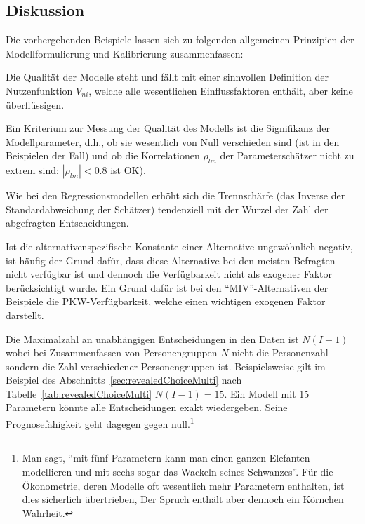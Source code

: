 \subsection{\label{sec:calibrDiskussion}Diskussion}
%
Die vorhergehenden Beispiele lassen sich zu folgenden allgemeinen
Prinzipien der Modellformulierung und Kalibrierung zusammenfassen:

\bi
\item Die Qualit\"at der Modelle steht und f\"allt mit einer
sinnvollen Definition der Nutzenfunktion $V_{ni}$, welche alle
wesentlichen Einflussfaktoren enth\"alt, aber keine
\"uber\-fl\"ussi\-gen.

\item Ein Kriterium zur Messung der Qualit\"at des Modells
 ist die Signifikanz der
Modellparameter, d.h., ob sie wesentlich von Null verschieden
sind (ist in den Beispielen der Fall) und ob die Korrelationen $\rho_{lm}$ der
Parametersch\"atzer nicht zu extrem  sind: $|\rho_{lm}|<0.8$ ist OK).

\item Wie bei den Regressionsmodellen erh\"oht sich die Trennsch\"arfe
  (das Inverse der Standardabweichung der Sch\"atzer)
  tendenziell mit der Wurzel der Zahl der abgefragten Entscheidungen.

\item Ist die alternativenspezifische Konstante einer Alternative
  ungew\"ohnlich negativ, ist h\"aufig der Grund daf\"ur, dass diese
  Alternative bei den meisten Befragten  nicht verf\"ugbar ist und dennoch die
  Verf\"ugbarkeit nicht als exogener Faktor ber\"ucksichtigt wurde.  Ein Grund
daf\"ur ist bei den ``MIV''-Alternativen der Beispiele die
 PKW-Verf\"ugbarkeit, welche einen
wichtigen exogenen Faktor darstellt.

\item Die Maximalzahl an unabh\"angigen Entscheidungen in den Daten
ist $N(I-1)$ wobei bei Zusammenfassen von Personengruppen $N$ nicht
die Personenzahl sondern die Zahl verschiedener Personengruppen ist. 
Beispielsweise gilt im Beispiel des
Abschnitts~\ref{sec:revealedChoiceMulti} nach
Tabelle~\ref{tab:revealedChoiceMulti} $N(I-1)=15$. Ein Modell mit 15
Parametern k\"onnte alle
Entscheidungen exakt wiedergeben. Seine Prognosef\"ahigkeit geht
dagegen gegen null.\footnote{Man sagt,
``mit f\"unf Parametern kann man einen ganzen Elefanten modellieren
und mit sechs sogar das Wackeln seines Schwanzes''. F\"ur die
\"Okonometrie, deren Modelle oft wesentlich mehr Parametern enthalten,
ist dies sicherlich 
\"ubertrieben, Der Spruch enth\"alt aber dennoch ein K\"ornchen Wahrheit.}

